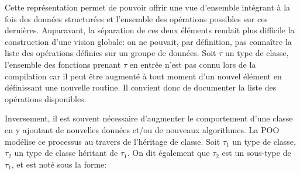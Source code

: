 Cette représentation permet de pouvoir offrir une vue d'ensemble
intégrant à la fois des données structurées et l'ensemble des
opérations possibles sur ces dernières. Auparavant, la séparation de
ces deux éléments rendait plus difficile la construction d'une vision
globale: on ne pouvait, par définition, pas connaître la liste des
opérations définies sur un groupe de données. Soit $\tau$ un type de
classe, l'ensemble des fonctions prenant $\tau$ en entrée n'est pas
connu lors de la compilation car il peut être augmenté à tout moment
d'un nouvel élément en définissant une nouvelle routine. Il convient
donc de documenter la liste des opérations disponibles.

Inversement, il est souvent nécessaire d'augmenter le comportement
d'une classe en y ajoutant de nouvelles données et/ou de nouveaux
algorithmes. La POO modélise ce processus au travers de l'héritage de
classe. Soit $\tau_1$ un type de classe, $\tau_2$ un type de classe
héritant de $\tau_1$. On dit également que $\tau_2$ est un sous-type
de $\tau_1$, et est noté sous la forme:


